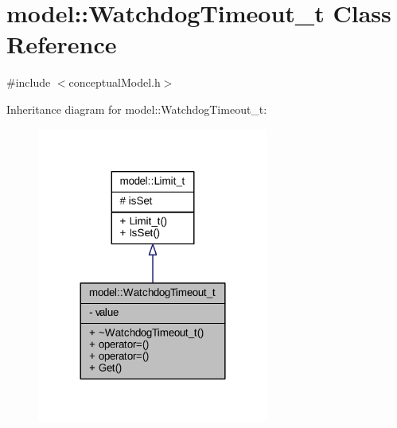 \hypertarget{classmodel_1_1_watchdog_timeout__t}{}\section{model\+:\+:Watchdog\+Timeout\+\_\+t Class Reference}
\label{classmodel_1_1_watchdog_timeout__t}


{\ttfamily \#include $<$conceptual\+Model.\+h$>$}



Inheritance diagram for model\+:\+:Watchdog\+Timeout\+\_\+t\+:
\nopagebreak
\begin{figure}[H]
\begin{center}
\leavevmode
\includegraphics[width=216pt]{classmodel_1_1_watchdog_timeout__t__inherit__graph}
\end{center}
\end{figure}


